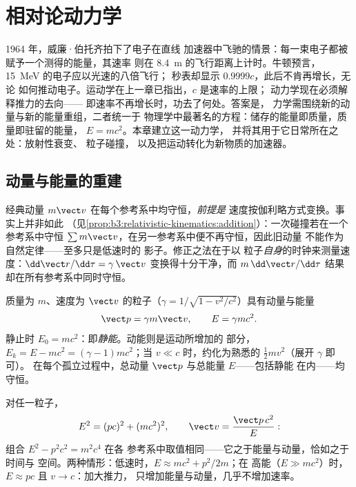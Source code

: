 \chapter{相对论动力学}\label{ch:b3:relativistic-dynamics}

1964 年，威廉·伯托齐拍下了电子在直线
加速器中飞驰的情景：每一束电子都被赋予一个测得的能量，其速率
则在 \qty{8.4}{m} 的飞行距离上计时。牛顿预言，
\qty{15}{MeV} 的电子应以光速的八倍飞行；
秒表却显示 $0.9999c$，此后不肯再增长，无论
如何推动电子。运动学在上一章已指出，$c$ 是速率的上限；
动力学现在必须解释推力的去向——
即速率不再增长时，功去了何处。答案是，
力学需围绕新的动量与新的能量重组，二者统一于
物理学中最著名的方程：储存的能量即质量，质量即驻留的能量，
$E = mc^2$。本章建立这一动力学，
并将其用于它日常所在之处：放射性衰变、
粒子碰撞，
以及把运动转化为新物质的加速器。

\section{动量与能量的重建}

\begin{remark}\label{rem:b3:relativistic-dynamics:why}
经典动量 $m\vect v$ 在每个参考系中均守恒，\emph{前提是}
速度按伽利略方式变换。事实上并非如此
（见\cref{prop:b3:relativistic-kinematics:addition}）：一次碰撞若在一个参考系中守恒
$\sum m\vect v$，在另一参考系中便不再守恒，因此旧动量
不能作为自然定律——至多只是低速时的
影子。修正之法在于以
粒子\emph{自身}的时钟来测量速度：$\dd\vect r/\dd\tau =
\gamma\,\vect v$ 变换得十分干净，而 $m\,\dd\vect r/\dd\tau$ 结果
却在所有参考系中同时守恒。
\end{remark}

\begin{definition}[相对论动量与能量]\label{def:b3:relativistic-dynamics:momentum-energy}
质量为 $m$、速度为 $\vect v$ 的粒子（$\gamma = 1/\sqrt{1 -
v^2/c^2}$）具有动量与能量
\[
\vect p = \gamma m\vect v , \qquad
E = \gamma mc^2 .
\]
静止时 $E_0 = mc^2$：即\emph{静能}。动能则是运动所增加的
部分，$E_k = E - mc^2 = (\gamma - 1)mc^2$；当 $v
\ll c$ 时，约化为熟悉的 $\tfrac12 mv^2$（展开 $\gamma$ 即可）。
在每个孤立过程中，总动量 $\vect p$ 与总能量 $E$——包括静能
在内——均守恒。
\end{definition}

\begin{theorem}[能量–动量关系]\label{thm:b3:relativistic-dynamics:relation}
对任一粒子，
\[
E^2 = (pc)^2 + (mc^2)^2 ,
\qquad
\vect v = \frac{\vect p\,c^2}{E} :
\]
组合 $E^2 - p^2c^2 = m^2c^4$ 在各
参考系中取值相同——它之于能量与动量，恰如之于时间与
空间。两种情形：低速时，$E \approx mc^2 + p^2/2m$；在
高能（$E \gg mc^2$）时，$E \approx pc$ 且 $v \to c$：加大推力，
只增加能量与动量，几乎不增加速率。
\end{theorem}

